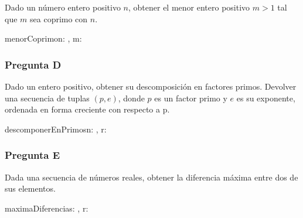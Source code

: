 Dado un número entero positivo $n$, obtener el menor entero positivo $m > 1$ tal que $m$ sea coprimo con $n$.


\begin{proc}{menorCoprimo}{\In n: \ent, \Out m: \ent}{}
\end{proc}

\subsubsection{Pregunta D}

Dado un entero positivo, obtener su descomposición en factores primos. Devolver una secuencia de tuplas $(p, e)$, donde $p$ es un factor primo y $e$ es su exponente, ordenada en forma creciente con respecto a p.





\begin{proc}{descomponerEnPrimos}{\In n: \ent, \Out r: \TLista{\ent \times \ent}}{}
\end{proc}

\subsubsection{Pregunta E}

Dada una secuencia de números reales, obtener la diferencia máxima entre dos de sus elementos.

\begin{proc}{maximaDiferencia}{\In s: \TLista{\float}, \Out r: \float}{}
\end{proc}

